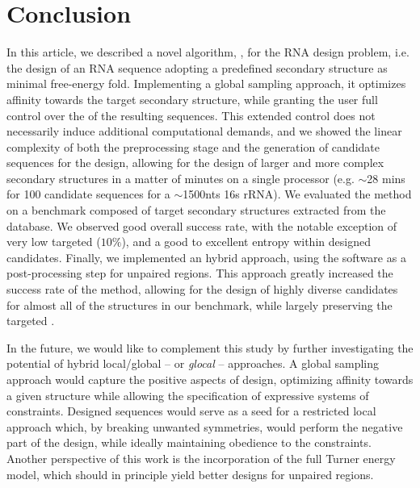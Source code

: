 \section{Conclusion}

\label{sec:conclusion}

In this article, we described a novel algorithm, \ourprog, for the RNA design problem, i.e. the design of an RNA sequence adopting a predefined secondary structure as minimal free-energy fold.
Implementing a global sampling approach, it optimizes affinity towards the target secondary structure, while granting the user full control over the \GCContent of the resulting sequences.
This extended control does not necessarily induce additional computational demands, and we showed the linear complexity of both the preprocessing stage and the generation of candidate sequences for the design, allowing for the design of larger and more complex secondary structures in a matter of minutes on a single processor (e.g. $\sim$28 mins for 100 candidate sequences for a $\sim$1500nts 16s rRNA). We evaluated the method on a benchmark composed of target secondary structures extracted from the \RNASTRAND database. We observed good overall success rate, with the notable exception of very low targeted \GCContent ($10\%$), and a good to excellent entropy within designed candidates.
Finally, we implemented an hybrid approach, using the \RNAinverse software as a post-processing step for unpaired regions. This approach greatly increased the success rate of the method, allowing for the design of highly diverse candidates for almost all of the structures in our benchmark, while largely preserving the targeted \GCContent.

In the future, we would like to complement this study by further investigating the potential of hybrid local/global -- or {\em glocal} -- approaches.
A global sampling approach would capture the positive aspects of design, optimizing affinity towards a given structure while allowing the specification of expressive systems of constraints.
Designed sequences would serve as a seed for a restricted local approach which, by breaking unwanted symmetries, would perform the negative part of the design, 
while ideally maintaining obedience to the constraints. Another perspective of this work is the incorporation of the full Turner energy model, which should in principle yield better designs for unpaired regions.
